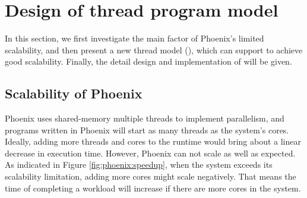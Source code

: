 \section{Design of thread program model}
In this section, we first investigate the main factor of Phoenix's limited scalability, 
and then present a new thread model (\myth), which can support \myds to achieve good scalability.
Finally, the detail design and implementation of \myth will be given.


\subsection{Scalability of Phoenix}
Phoenix uses shared-memory multiple threads to implement parallelism, and programs written in Phoenix will start as many threads as the system's cores.
Ideally, adding more threads and cores to the runtime would bring about a linear decrease in execution time.
However, Phoenix can not scale as well as expected.
As indicated in Figure \ref{fig:phoenix:speedup}, when the system exceeds its scalability limitation, adding more cores might scale negatively.
That means the time of completing a workload will increase if there are more cores in the system. 

